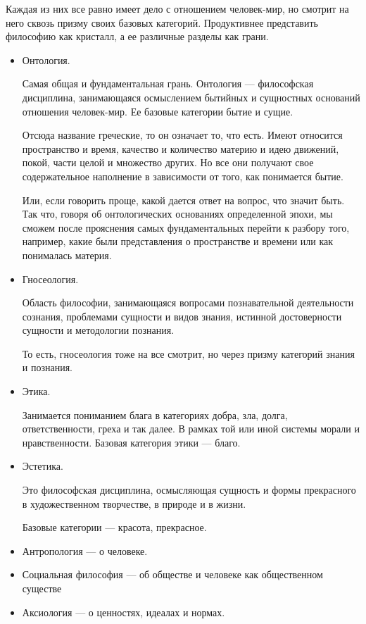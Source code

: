 Каждая из них все равно имеет дело с отношением человек-мир, но смотрит на него сквозь призму
своих базовых категорий. Продуктивнее представить философию как кристалл, а ее различные разделы как грани. 
\begin{itemize}
    \item Онтология.
    
    Самая общая и фундаментальная грань. Онтология --- философская
    дисциплина, занимающаяся осмыслением бытийных и сущностных оснований отношения человек-мир. 
    Ее базовые категории бытие и сущие.
    
    Отсюда название греческие, то он означает то, что есть. Имеют относится
    пространство и время, качество и количество материю и идею движений, покой,
    части целой и множество других. Но все они получают свое содержательное
    наполнение в зависимости от того, как понимается бытие. 
    
    Или, если говорить
    проще, какой дается ответ на вопрос, что значит быть. Так что, говоря об
    онтологических основаниях определенной эпохи, мы сможем после прояснения самых
    фундаментальных перейти к разбору того, например, какие были представления о
    пространстве и времени или как понималась материя. 

    \item Гносеология.

    Область философии, занимающаяся вопросами познавательной
    деятельности сознания, проблемами сущности и видов знания, истинной
    достоверности сущности и методологии познания.

    То есть, гносеология тоже на все смотрит, но через призму категорий знания и познания. 

    \item Этика.
    
    Занимается пониманием блага в категориях добра, зла, долга, ответственности, греха и так
    далее. В рамках той или иной системы морали и нравственности. Базовая категория этики --- благо.

    \item Эстетика.

     Это философская дисциплина, осмысляющая сущность и формы прекрасного в художественном творчестве, в природе и в жизни. 

     Базовые категории --- красота, прекрасное.

     \item Антропология --- о человеке.
     \item Социальная философия --- об обществе и человеке как общественном существе
     \item Аксиология ---  о ценностях, идеалах и нормах.

     
\end{itemize}

